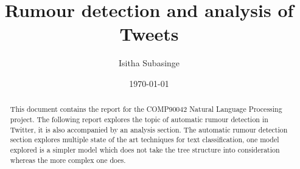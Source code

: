 \documentclass[11pt,a4paper]{article}
\title{Rumour detection and analysis of Tweets}
\author{Isitha Subasinge}
\date{\today}
\begin{document}
\maketitle

\begin{abstract}
This document contains the report for the COMP90042 Natural Language Processing project. The following report explores 
the topic of automatic rumour detection in Twitter, it is also accompanied by an analysis section. The automatic rumour detection section
explores multiple state of the art techniques for text classification, one model explored is a simpler model which does not take the tree structure into consideration
whereas the more complex one does.
\end{abstract}






\nocite{baris_schmelzeisen_staab_2019}
\nocite{ma_gao_wong_2018}
\nocite{burchell}
\nocite{Gardner2017AllenNLP}






\end{document}
